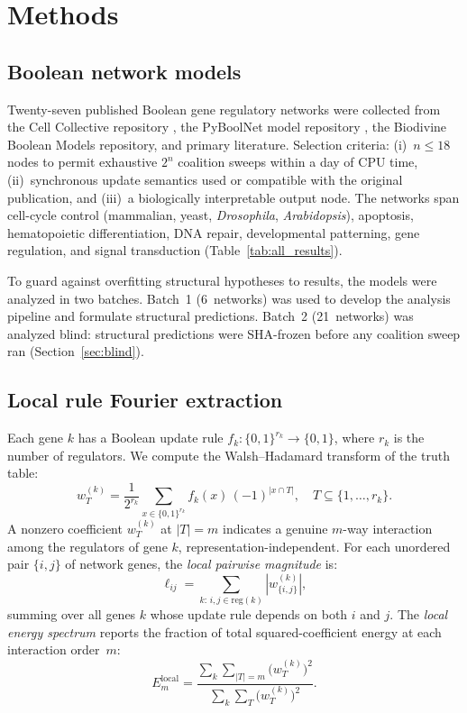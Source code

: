 \documentclass[10pt,letterpaper]{article}
\begin{document}
\section*{Methods}
\label{sec:methods}

\subsection*{Boolean network models}
\label{sec:models}

Twenty-seven published Boolean gene regulatory networks were collected
from the Cell Collective repository \cite{helikar2012cell}, the
PyBoolNet model repository \cite{klarner2017pyboolnet}, the Biodivine
Boolean Models repository, and primary literature. Selection criteria:
(i)~$n \leq 18$ nodes to permit exhaustive $2^n$ coalition sweeps
within a day of CPU time, (ii)~synchronous update semantics used or
compatible with the original publication, and (iii)~a biologically
interpretable output node. The networks span cell-cycle control
(mammalian, yeast, \emph{Drosophila}, \emph{Arabidopsis}), apoptosis,
hematopoietic differentiation, DNA repair, developmental patterning,
gene regulation, and signal transduction (Table~\ref{tab:all_results}).

To guard against overfitting structural hypotheses to results, the
models were analyzed in two batches. Batch~1 (6~networks) was used to
develop the analysis pipeline and formulate structural predictions.
Batch~2 (21~networks) was analyzed blind: structural predictions were
SHA-frozen before any coalition sweep ran
(Section~\ref{sec:blind}).


\subsection*{Local rule Fourier extraction}
\label{sec:local-fourier}

Each gene $k$ has a Boolean update rule $f_k\colon \{0,1\}^{r_k}
\to \{0,1\}$, where $r_k$ is the number of regulators. We compute
the Walsh--Hadamard transform of the truth table:
%
\begin{equation}
\label{eq:local-wht}
w_T^{(k)} = \frac{1}{2^{r_k}} \sum_{x \in \{0,1\}^{r_k}} f_k(x)\,(-1)^{|x \cap T|},
\quad T \subseteq \{1, \ldots, r_k\}.
\end{equation}
%
A nonzero coefficient $w_T^{(k)}$ at $|T| = m$ indicates a genuine
$m$-way interaction among the regulators of gene $k$,
representation-independent. For each unordered pair $\{i,j\}$ of
network genes, the \emph{local pairwise magnitude} is:
%
\begin{equation}
\label{eq:local-pair}
\ell_{ij} = \sum_{k:\, i,j \in \mathrm{reg}(k)} |w_{\{i,j\}}^{(k)}|,
\end{equation}
%
summing over all genes $k$ whose update rule depends on both $i$ and
$j$. The \emph{local energy spectrum} reports the fraction of total
squared-coefficient energy at each interaction order~$m$:
%
\begin{equation}
\label{eq:local-spectrum}
E_m^{\mathrm{local}} = \frac{\sum_k \sum_{|T|=m} \bigl(w_T^{(k)}\bigr)^2}
{\sum_k \sum_T \bigl(w_T^{(k)}\bigr)^2}.
\end{equation}
\end{document}
